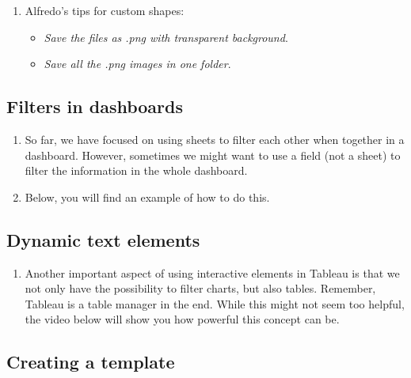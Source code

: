 \documentclass[
]{book}
\providecommand{\tightlist}{%
  \setlength{\itemsep}{0pt}\setlength{\parskip}{0pt}}
\begin{document}
\begin{enumerate}
\def\labelenumi{\arabic{enumi}.}
\setcounter{enumi}{2}
\tightlist
\item
  Alfredo's tips for custom shapes:

  \begin{itemize}
  \tightlist
  \item
    \emph{Save the files as .png with transparent background}.
  \item
    \emph{Save all the .png images in one folder}.
  \end{itemize}
\end{enumerate}

\hypertarget{filters-in-dashboards}{%
\subsection{Filters in dashboards}\label{filters-in-dashboards}}

\begin{enumerate}
\def\labelenumi{\arabic{enumi}.}
\item
  So far, we have focused on using sheets to filter each other when together in a dashboard. However, sometimes we might want to use a field (not a sheet) to filter the information in the whole dashboard.
\item
  Below, you will find an example of how to do this.
\end{enumerate}

\hypertarget{dynamic-text-elements}{%
\subsection{Dynamic text elements}\label{dynamic-text-elements}}

\begin{enumerate}
\def\labelenumi{\arabic{enumi}.}
\tightlist
\item
  Another important aspect of using interactive elements in Tableau is that we not only have the possibility to filter charts, but also tables. Remember, Tableau is a table manager in the end. While this might not seem too helpful, the video below will show you how powerful this concept can be.
\end{enumerate}

\hypertarget{creating-a-template}{%
\subsection{Creating a template}\label{creating-a-template}}
\end{document}
